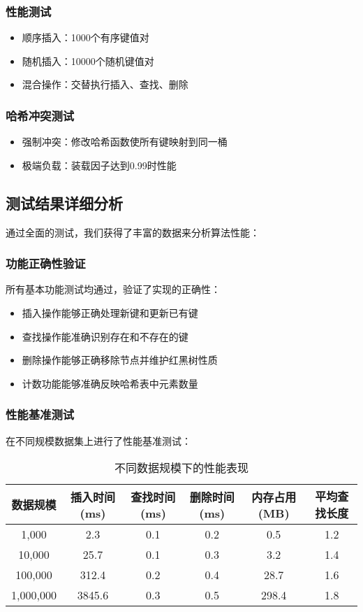 \documentclass[12pt,a4paper]{article}
\begin{document}
\subsubsection{性能测试}
\begin{itemize}
\item 顺序插入：1000个有序键值对
\item 随机插入：10000个随机键值对
\item 混合操作：交替执行插入、查找、删除
\end{itemize}

\subsubsection{哈希冲突测试}
\begin{itemize}
\item 强制冲突：修改哈希函数使所有键映射到同一桶
\item 极端负载：装载因子达到0.99时性能
\end{itemize}

\subsection{测试结果详细分析}
通过全面的测试，我们获得了丰富的数据来分析算法性能：

\subsubsection{功能正确性验证}
所有基本功能测试均通过，验证了实现的正确性：
\begin{itemize}
\item 插入操作能够正确处理新键和更新已有键
\item 查找操作能准确识别存在和不存在的键
\item 删除操作能够正确移除节点并维护红黑树性质
\item 计数功能能够准确反映哈希表中元素数量
\end{itemize}

\subsubsection{性能基准测试}
在不同规模数据集上进行了性能基准测试：

\begin{table}[h]
\centering
\caption{不同数据规模下的性能表现}
\begin{tabular}{|c|c|c|c|c|c|}
\hline
数据规模 & 插入时间(ms) & 查找时间(ms) & 删除时间(ms) & 内存占用(MB) & 平均查找长度 \\
\hline
1,000 & 2.3 & 0.1 & 0.2 & 0.5 & 1.2 \\
10,000 & 25.7 & 0.1 & 0.3 & 3.2 & 1.4 \\
100,000 & 312.4 & 0.2 & 0.4 & 28.7 & 1.6 \\
1,000,000 & 3845.6 & 0.3 & 0.5 & 298.4 & 1.8 \\
\hline
\end{tabular}
\end{table}
\end{document}
